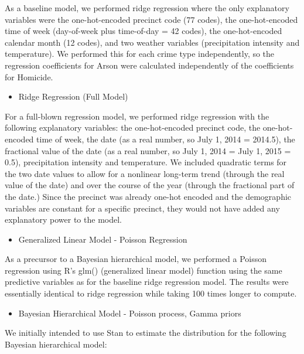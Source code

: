 \documentclass[10pt,journal,compsoc]{IEEEtran}
\begin{document}
As a baseline model, we performed ridge regression where the only explanatory
variables were the one-hot-encoded precinct code (77 codes), the one-hot-encoded
time of week (day-of-week plus time-of-day = 42 codes), the one-hot-encoded calendar
month (12 codes), and two weather variables (precipitation intensity and temperature).
We performed this for each crime type independently, so the regression coefficients for
Arson were calculated independently of the coefficients for Homicide.\\

\begin{itemize}
  \item Ridge Regression (Full Model)
\end{itemize}

For a full-blown regression model, we performed ridge regression with the following
explanatory variables: the one-hot-encoded precinct code, the one-hot-encoded time of
week, the date (as a real number, so July 1, 2014 = 2014.5), the fractional value of the
date (as a real number, so July 1, 2014 = July 1, 2015 = 0.5), precipitation intensity and temperature. We included quadratic terms for the two date values to allow for a
nonlinear long-term trend (through the real value of the date) and over the course of the
year (through the fractional part of the date.) Since the precinct was already one-hot
encoded and the demographic variables are constant for a specific precinct, they would
not have added any explanatory power to the model.\\

\begin{itemize}
  \item Generalized Linear Model - Poisson Regression
\end{itemize}

As a precursor to a Bayesian hierarchical model, we performed a Poisson regression
using R's glm() (generalized linear model) function using the same predictive variables
as for the baseline ridge regression model. The results were essentially identical to
ridge regression while taking 100 times longer to compute.\\

\begin{itemize}
  \item Bayesian Hierarchical Model - Poisson process, Gamma priors
\end{itemize}

We initially intended to use Stan to estimate the distribution for the following Bayesian
hierarchical model:\\
\end{document}
